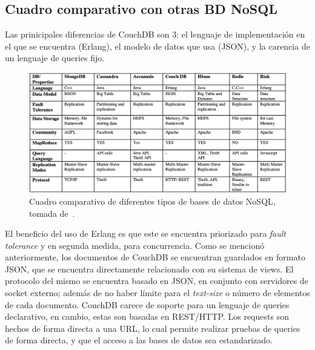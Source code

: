 \documentclass{article}
\begin{document}
        \subsection{Cuadro comparativo con otras BD NoSQL}
            Las prinicipales diferencias de CouchDB son 3: el lenguaje de implementación en el que se encuentra (Erlang), el modelo de datos que usa (JSON), y la carencia de un lenguaje de queries fijo.\\
            \begin{figure}[h]
                \caption{Cuadro comparativo de diferentes tipos de bases de datos NoSQL, tomada de \cite{sandeep}.}
                \includegraphics[width = \textwidth]{comparisonTable.png}
            \end{figure}
            El beneficio del uso de Erlang es que este se encuentra priorizado para \textit{fault tolerance} y en segunda medida, para concurrencia. Como se mencionó anteriormente, los documentos de CouchDB se encuentran guardados en formato JSON, que se encuentra directamente relacionado con su sistema de views. El protocolo del mismo se encuentra basado en JSON, en conjunto con servidores de socket externo; además de no haber límite para el \textit{text-size} o número de elementos de cada documento. CouchDB carece de soporte para un lenguaje de queries declarativo, en cambio, estas son basadas en REST/HTTP. Los requests son hechos de forma directa a una URL, lo cual permite realizar pruebas de queries de forma directa, y que el acceso a las bases de datos sea estandarizado. 
\end{document}
